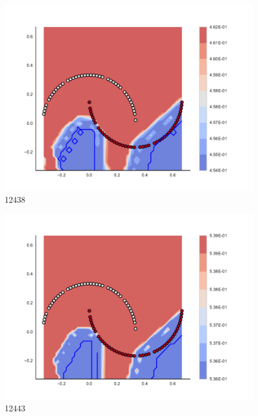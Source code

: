 \begin{subfigure}[b]{0.09\textwidth}
    \includegraphics[clip, trim=2.35cm 1.75cm 4.5cm 0cm,width=\textwidth]{img/convergence/12438.pdf}
    \caption{12438}
    \label{fig:convergence_12438}
\end{subfigure}
%
\begin{subfigure}[b]{0.09\textwidth}
    \includegraphics[clip, trim=2.35cm 1.75cm 4.5cm 0cm,width=\textwidth]{img/convergence/12443.pdf}
    \caption{12443}
    \label{fig:convergence_12443}
\end{subfigure}
%
